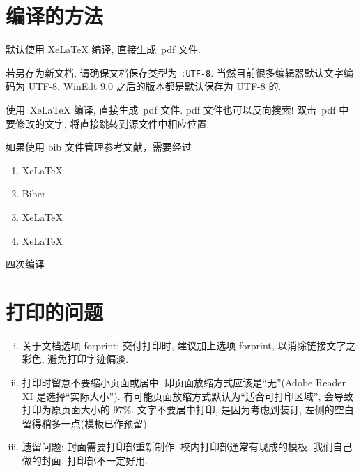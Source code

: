 \documentclass[class = professional, oneside]{gdufe_master_thesis}
\begin{document}
\section{编译的方法}\label{sec-compile}

默认使用 XeLaTeX 编译, 直接生成~pdf 文件.

若另存为新文档, 请确保文档保存类型为 \verb|:UTF-8|. 当然目前很多编辑器默认文字编码为 UTF-8.
WinEdt 9.0 之后的版本都是默认保存为 UTF-8 的.

使用~XeLaTeX 编译, 直接生成~pdf 文件.
pdf 文件也可以反向搜索! 双击~pdf 中要修改的文字, 将直接跳转到源文件中相应位置.

如果使用 bib 文件管理参考文献，需要经过
\begin{enumerate}
    \item XeLaTeX

    \item Biber

    \item XeLaTeX

    \item XeLaTeX
\end{enumerate}
四次编译




\section{打印的问题}
\begin{enumerate}[i)]
    \item  关于文档选项 forprint: 交付打印时, 建议加上选项 forprint, 以消除链接文字之彩色, 避免打印字迹偏淡.
    \item  打印时留意不要缩小页面或居中. 即页面放缩方式应该是``无''(Adobe Reader XI 是选择``实际大小'').
          有可能页面放缩方式默认为``适合可打印区域'', 会导致打印为原页面大小的 $97\%$.
          文字不要居中打印, 是因为考虑到装订, 左侧的空白留得稍多一点(模板已作预留).
    \item  遗留问题: 封面需要打印部重新制作.  校内打印部通常有现成的模板.
          我们自己做的封面, 打印部不一定好用.
\end{enumerate}
\end{document}
